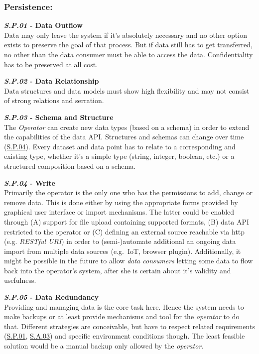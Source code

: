 \documentclass[12pt,english,a4paper,titlepage,cleardoublepage=empty,dottedtoc]{report}
\begin{document}
\subsubsection{Persistence:}\label{persistence}

\textbf{\emph{\protect\hypertarget{sp01}{}{S.P.01}} - Data Outflow}\\
Data may only leave the system if it's absolutely necessary and no other
option exists to preserve the goal of that process. But if data still
has to get transferred, no other than the data consumer must be able to
access the data. Confidentiality has to be preserved at all cost.

\textbf{\emph{\protect\hypertarget{sp02}{}{S.P.02}} - Data
Relationship}\\
Data structures and data models must show high flexibility and may not
consist of strong relations and serration.

\textbf{\emph{\protect\hypertarget{sp03}{}{S.P.03}} - Schema and
Structure}\\
The \emph{Operator} can create new data types (based on a schema) in
order to extend the capabilities of the data API. Structures and schemas
can change over time (\protect\hyperlink{sp04}{S.P.04}). Every dataset
and data point has to relate to a corresponding and existing type,
whether it's a simple type (string, integer, boolean, etc.) or a
structured composition based on a schema.

\textbf{\emph{\protect\hypertarget{sp04}{}{S.P.04}} - Write}\\
Primarily the operator is the only one who has the permissions to add,
change or remove data. This is done either by using the appropriate
forms provided by graphical user interface or import mechanisms. The
latter could be enabled through (A) support for file upload containing
supported formats, (B) data API restricted to the operator or (C)
defining an external source reachable via http (e.g. \emph{RESTful URI})
in order to (semi-)automate additional an ongoing data import from
multiple data sources (e.g.~IoT, browser plugin). Additionally, it might
be possible in the future to allow \emph{data consumers} letting some
data to flow back into the operator's system, after she is certain about
it's validity and usefulness.

\textbf{\emph{\protect\hypertarget{sp05}{}{S.P.05}} - Data Redundancy}\\
Providing and managing data is the core task here. Hence the system
needs to make backups or at least provide mechanisms and tool for the
\emph{operator} to do that. Different strategies are conceivable, but
have to respect related requirements (\protect\hyperlink{sp01}{S.P.01},
\protect\hyperlink{sa03}{S.A.03}) and specific environment conditions
though. The least feasible solution would be a manual backup only
allowed by the \emph{operator}.
\end{document}
